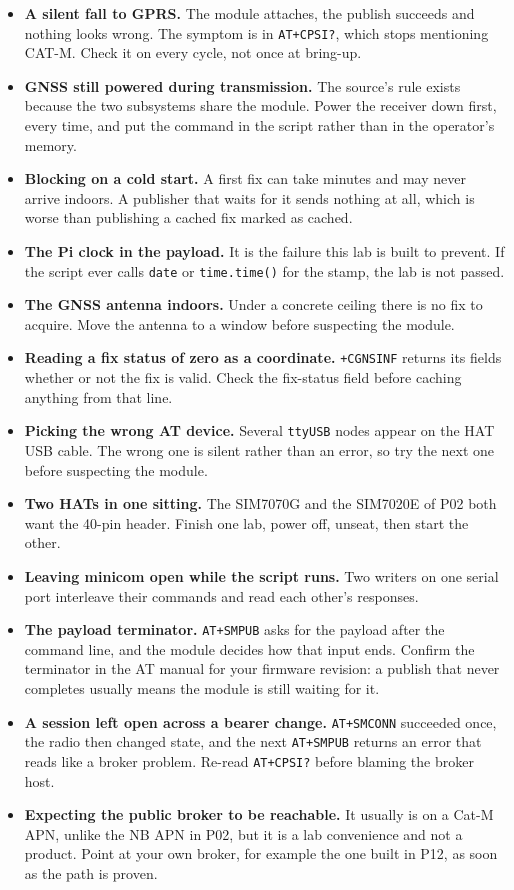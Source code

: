 \begin{itemize}
\item \textbf{A silent fall to GPRS.} The module attaches, the publish succeeds and nothing looks wrong. The symptom is in \texttt{AT+CPSI?}, which stops mentioning CAT-M. Check it on every cycle, not once at bring-up.
\item \textbf{GNSS still powered during transmission.} The source's rule exists because the two subsystems share the module. Power the receiver down first, every time, and put the command in the script rather than in the operator's memory.
\item \textbf{Blocking on a cold start.} A first fix can take minutes and may never arrive indoors. A publisher that waits for it sends nothing at all, which is worse than publishing a cached fix marked as cached.
\item \textbf{The Pi clock in the payload.} It is the failure this lab is built to prevent. If the script ever calls \texttt{date} or \texttt{time.time()} for the stamp, the lab is not passed.
\item \textbf{The GNSS antenna indoors.} Under a concrete ceiling there is no fix to acquire. Move the antenna to a window before suspecting the module.
\item \textbf{Reading a fix status of zero as a coordinate.} \texttt{+CGNSINF} returns its fields whether or not the fix is valid. Check the fix-status field before caching anything from that line.
\item \textbf{Picking the wrong AT device.} Several \texttt{ttyUSB} nodes appear on the HAT USB cable. The wrong one is silent rather than an error, so try the next one before suspecting the module.
\item \textbf{Two HATs in one sitting.} The SIM7070G and the SIM7020E of P02 both want the 40-pin header. Finish one lab, power off, unseat, then start the other.
\item \textbf{Leaving minicom open while the script runs.} Two writers on one serial port interleave their commands and read each other's responses.
\item \textbf{The payload terminator.} \texttt{AT+SMPUB} asks for the payload after the command line, and the module decides how that input ends. Confirm the terminator in the AT manual for your firmware revision: a publish that never completes usually means the module is still waiting for it.
\item \textbf{A session left open across a bearer change.} \texttt{AT+SMCONN} succeeded once, the radio then changed state, and the next \texttt{AT+SMPUB} returns an error that reads like a broker problem. Re-read \texttt{AT+CPSI?} before blaming the broker host.
\item \textbf{Expecting the public broker to be reachable.} It usually is on a Cat-M APN, unlike the NB APN in P02, but it is a lab convenience and not a product. Point at your own broker, for example the one built in P12, as soon as the path is proven.
\end{itemize}

